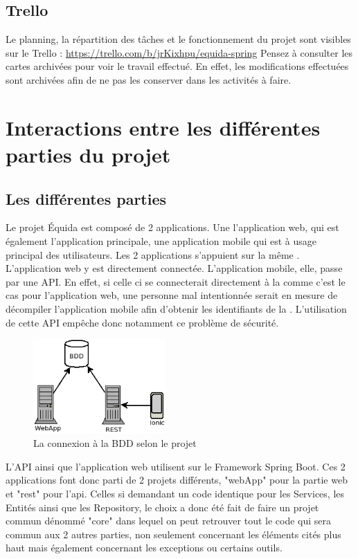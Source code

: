 		\subsection{Trello}
			Le planning, la répartition des tâches et le fonctionnement du projet sont visibles sur le Trello : \url{https://trello.com/b/jrKixhpu/equida-spring}
			Pensez à consulter les cartes archivées pour voir le travail effectué. En effet, les modifications effectuées sont archivées afin de ne pas les conserver dans les activités à faire.

	\section{Interactions entre les différentes parties du projet}
		\subsection{Les différentes parties}
			Le projet Équida est composé de 2 applications. Une l'application web, qui est également l'application principale, une application mobile qui est à usage principal des utilisateurs. Les 2 applications s'appuient sur la même \bdd{}. L'application web y est directement connectée. L'application mobile, elle, passe par une API. En effet, si celle ci se connecterait directement à la \bdd{} comme c'est le cas pour l'application web, une personne mal intentionnée serait en mesure de décompiler l'application mobile afin d'obtenir les identifiants de la \bdd{}. L'utilisation de cette API empêche donc notamment ce problème de sécurité.

			\begin{figure}[H]
				\centering\includegraphics[width=0.45\textwidth, keepaspectratio]{res/diag_infra.png}
				\caption{La connexion à la BDD selon le projet}
			\end{figure}

			L'API ainsi que l'application web utilisent sur le Framework Spring Boot. Ces 2 applications font donc parti de 2 projets différents, "webApp" pour la partie web et "rest" pour l'api. Celles si demandant un code identique pour les Services, les Entités ainsi que les Repository, le choix a donc été fait de faire un projet commun dénommé "core" dans lequel on peut retrouver tout le code qui sera commun aux 2 autres parties, non seulement concernant les éléments cités plus haut mais également concernant les exceptions ou certains outils.

